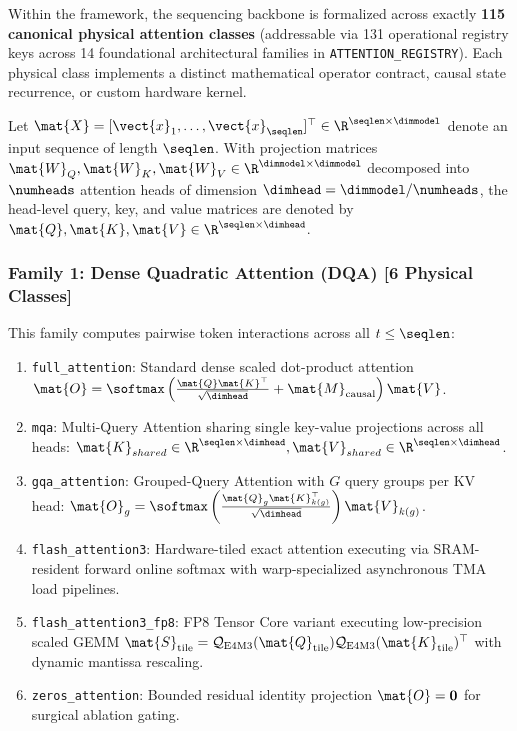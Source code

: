 Within the \neuralops{} framework, the sequencing backbone is formalized across exactly \textbf{115 canonical physical attention classes} (addressable via 131 operational registry keys across 14 foundational architectural families in \texttt{ATTENTION\_REGISTRY}). Each physical class implements a distinct mathematical operator contract, causal state recurrence, or custom hardware kernel.

Let $\mat{X} = [\vect{x}_1, \dots, \vect{x}_{\seqlen}]^\top \in \R^{\seqlen \times \dimmodel}$ denote an input sequence of length $\seqlen$. With projection matrices $\mat{W}_Q, \mat{W}_K, \mat{W}_V \in \R^{\dimmodel \times \dimmodel}$ decomposed into $\numheads$ attention heads of dimension $\dimhead = \dimmodel / \numheads$, the head-level query, key, and value matrices are denoted by $\mat{Q}, \mat{K}, \mat{V} \in \R^{\seqlen \times \dimhead}$.

\subsubsection{Family 1: Dense Quadratic Attention (DQA) [6 Physical Classes]}
This family computes pairwise token interactions across all $t \le \seqlen$:
\begin{enumerate}
    \item \texttt{full\_attention}: Standard dense scaled dot-product attention $\mat{O} = \softmax\left(\frac{\mat{Q}\mat{K}^\top}{\sqrt{\dimhead}} + \mat{M}_{\text{causal}}\right)\mat{V}$.
    \item \texttt{mqa}: Multi-Query Attention sharing single key-value projections across all heads: $\mat{K}_{shared} \in \R^{\seqlen \times \dimhead}, \mat{V}_{shared} \in \R^{\seqlen \times \dimhead}$.
    \item \texttt{gqa\_attention}: Grouped-Query Attention with $G$ query groups per KV head: $\mat{O}_g = \softmax\left(\frac{\mat{Q}_g \mat{K}_{k(g)}^\top}{\sqrt{\dimhead}}\right)\mat{V}_{k(g)}$.
    \item \texttt{flash\_attention3}: Hardware-tiled exact attention executing via SRAM-resident forward online softmax with warp-specialized asynchronous TMA load pipelines.
    \item \texttt{flash\_attention3\_fp8}: FP8 Tensor Core variant executing low-precision scaled GEMM $\mat{S}_{\text{tile}} = \mathcal{Q}_{\text{E4M3}}(\mat{Q}_{\text{tile}}) \mathcal{Q}_{\text{E4M3}}(\mat{K}_{\text{tile}})^\top$ with dynamic mantissa rescaling.
    \item \texttt{zeros\_attention}: Bounded residual identity projection $\mat{O} = \mathbf{0}$ for surgical ablation gating.
\end{enumerate}

